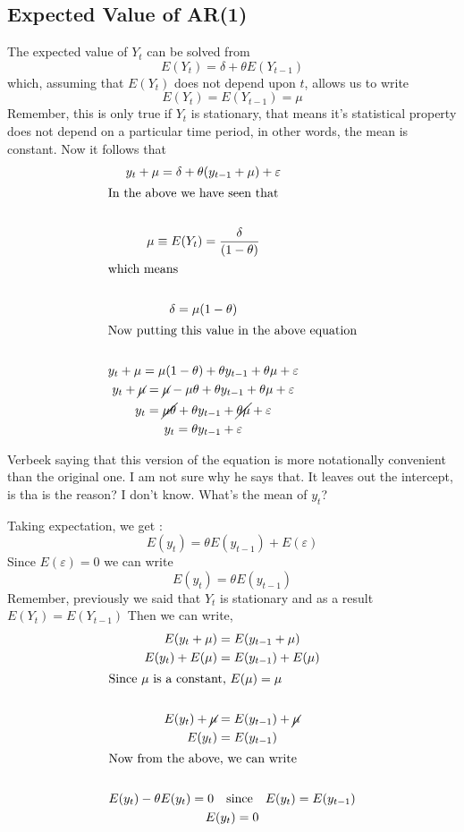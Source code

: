 \documentclass{book}
\begin{document}
\subsection{Expected Value of AR(1)}
	The expected value of $Y_t$ can be solved from 
	\[E(Y_t)=\delta+\theta E(Y_{t-1})\]
which, assuming that $E(Y_t)$ does not depend upon $t$, allows us to write 
	\begin{equation*}
		E(Y_t)=E(Y_{t-1})=\mu
		\label{}
	\end{equation*}
Remember, this is only true if $Y_t$ is stationary, that means it's statistical property does not depend on a particular time period, in other words, the mean is constant. Now it follows that 
		 \begin{gather*}
			y_t+\mu=\delta+\theta (y_{t-1}+\mu)+\varepsilon \\
			\intertext{In the above we have seen that} \\
			\mu\equiv E(Y_t)=\frac{\delta}{(1-\theta)} \nonumber \\
			\intertext{which means} \\
			\delta=\mu (1-\theta) \\
			\intertext{Now putting this value in the above equation} \\
			y_t+\mu=\mu (1-\theta)+\theta y_{t-1}+\theta \mu+\varepsilon \\
			y_t+\cancel{\mu}=\cancel{\mu}-\mu \theta+\theta y_{t-1}+\theta \mu+\varepsilon \\
			y_t=\cancel{\mu \theta}+\theta y_{t-1}+\cancel{\theta \mu}+\varepsilon \\
			y_t=\theta y_{t-1}+\varepsilon
		\end{gather*}

Verbeek saying that this version of the equation is more notationally convenient than the original one. I am not sure why he says that. It leaves out the intercept, is tha is the reason? I don't know. What's the mean of $y_t$?

Taking expectation, we get :  \[
	E(y_t)=\theta E(y_{t-1})+ E(\varepsilon)
\]
Since $E(\varepsilon)=0$ we can write \[
	E(y_t)=\theta E(y_{t-1})
\]
Remember, previously we said that $Y_t$ is stationary and as a result $E(Y_t)=E(Y_{t-1})$
Then we can write,
\begin{gather*}
	E(y_t+\mu)=E(y_{t-1}+\mu) \\
	E(y_t)+E(\mu)=E(y_{t-1})+E(\mu) \\
	\intertext{Since $\mu$ is a constant, $E(\mu)=\mu$} \\
	E(y_t)+\cancel{\mu}=E(y_{t-1})+\cancel{\mu} \\
	E(y_t)=E(y_{t-1}) \\
	\intertext{Now from the above, we can write} \\
	E(y_t)-\theta E(y_t)=0 \quad \text{since} \quad E(y_t)=E(y_{t-1}) \\
	E(y_t)=0
\end{gather*}
\end{document}
